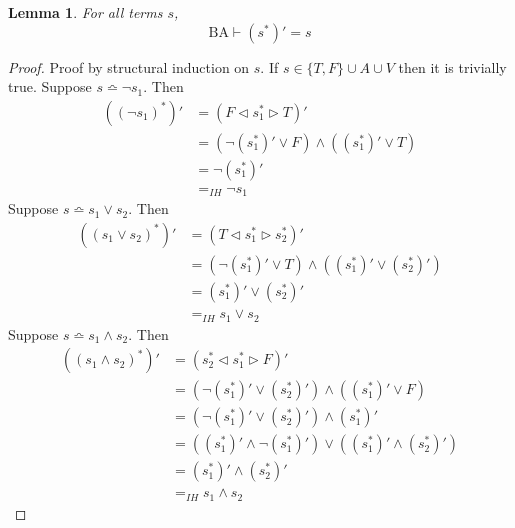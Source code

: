 \documentclass[a4paper,twoside,openright]{report}
\newcommand{\syn}{\bumpeq}
\newcommand{\lef}{\ensuremath{\triangleleft}}
\newcommand{\rig}{\ensuremath{\triangleright}}
\newtheorem{lem}[theorem]{Lemma}
\begin{document}
\begin{lem}\label{trans invariance BA lem}
For all terms $s$, 
\[
\text{BA}\vdash(s^*)'=s
\]
\end{lem}
\begin{proof}
Proof by structural induction on $s$. If $s\in\{T,F\}\cup A\cup V$ then it is trivially true. Suppose $s\syn\neg s_1$. Then
\begin{align*}
((\neg s_1)^*)' &= (F\lef s_1^*\rig T)'\\
&=(\neg(s_1^*)'\vee F)\wedge((s_1^*)'\vee T)\\
&=\neg(s_1^*)'\\
&=_{IH}\neg s_1
\end{align*}
Suppose $s\syn s_1\vee s_2$. Then
\begin{align*}
((s_1\vee s_2)^*)' &= (T\lef s_1^*\rig s_2^*)'\\
&=(\neg(s_1^*)'\vee T)\wedge((s_1^*)'\vee(s_2^*)')\\
&=(s_1^*)'\vee(s_2^*)'\\
&=_{IH}s_1\vee s_2
\end{align*}
Suppose $s\syn s_1\wedge s_2$. Then
\begin{align*}
((s_1\wedge s_2)^*)' &= (s_2^*\lef s_1^*\rig F)'\\
&= (\neg(s_1^*)'\vee(s_2^*)')\wedge((s_1^*)'\vee F)\\
&= (\neg(s_1^*)'\vee(s_2^*)')\wedge(s_1^*)'\\
&= ((s_1^*)'\wedge\neg(s_1^*)')\vee((s_1^*)'\wedge(s_2^*)')\\
&= (s_1^*)'\wedge(s_2^*)'\\
&=_{IH} s_1\wedge s_2
\end{align*}
\end{proof}
\end{document}
